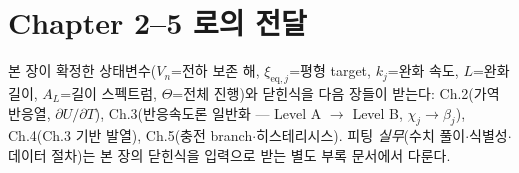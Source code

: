 \documentclass[11pt,a4paper]{article}
\newcommand{\eq}{\mathrm{eq}}
\begin{document}
\section*{Chapter 2--5 로의 전달}
본 장이 확정한 상태변수($V_n$=전하 보존 해, $\xi_{\eq,j}$=평형 target, $k_j$=완화 속도, $L$=완화 길이,
$A_L$=길이 스펙트럼, $\Theta$=전체 진행)와 닫힌식을 다음 장들이 받는다: Ch.2(가역 반응열, $\partial U/
\partial T$), Ch.3(반응속도론 일반화 — Level A $\to$ Level B, $\chi_j\to\beta_j$), Ch.4(Ch.3 기반 발열),
Ch.5(충전 branch$\cdot$히스테리시스). 피팅 \emph{실무}(수치 풀이$\cdot$식별성$\cdot$데이터 절차)는 본 장의
닫힌식을 입력으로 받는 별도 부록 문서에서 다룬다.
\end{document}
